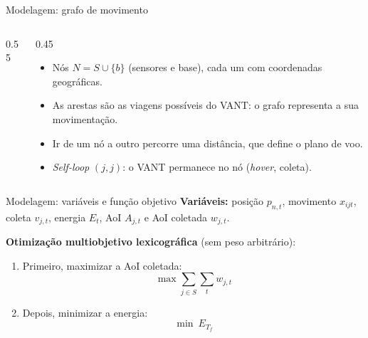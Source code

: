 \documentclass[aspectratio=169,11pt]{beamer}
\begin{document}
\begin{frame}{Modelagem: grafo de movimento}
  \begin{columns}[c]
    \begin{column}{0.55\textwidth}
      \centering
    \end{column}
    \begin{column}{0.45\textwidth}
      \begin{itemize}
        \item Nós $N = S \cup \{b\}$ (sensores e base), cada um com coordenadas geográficas.
        \item As arestas são as viagens possíveis do VANT: o grafo representa a sua movimentação.
        \item Ir de um nó a outro percorre uma distância, que define o plano de voo.
        \item \emph{Self-loop} $(j,j)$: o VANT permanece no nó (\emph{hover}, coleta).
      \end{itemize}
    \end{column}
  \end{columns}
\end{frame}

\begin{frame}{Modelagem: variáveis e função objetivo}
  \textbf{Variáveis:} posição $p_{n,t}$, movimento $x_{ijt}$, coleta $v_{j,t}$, energia $E_t$, AoI $A_{j,t}$ e AoI coletada $w_{j,t}$.

  \vspace{0.8em}
  \textbf{Otimização multiobjetivo lexicográfica} (sem peso arbitrário):

  \begin{enumerate}
    \item Primeiro, maximizar a AoI coletada:
      \[
        \max \sum_{j \in S} \sum_{t} w_{j,t}
      \]
    \item Depois, minimizar a energia:
      \[
        \min\ E_{T_f}
      \]
  \end{enumerate}
\end{frame}
\end{document}
